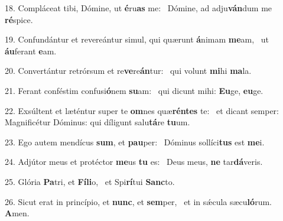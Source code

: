 18. Compláceat tibi, Dómine, ut \textbf{é}ru\textbf{as} me: \ast\  Dómine, ad adju\textbf{ván}dum me \textbf{ré}spice.\

19. Confundántur et revereántur simul, qui quærunt \textbf{á}nimam \textbf{me}am, \ast\  ut \textbf{áu}ferant \textbf{e}am.\

20. Convertántur retrórsum et re\textbf{ve}re\textbf{án}tur: \ast\  qui volunt \textbf{mi}hi \textbf{ma}la.\

21. Ferant conféstim confusi\textbf{ó}nem \textbf{su}am: \ast\  qui dicunt mihi: \textbf{Eu}ge, \textbf{eu}ge.\

22. Exsúltent et læténtur super te \textbf{om}nes quæ\textbf{rén}\textbf{tes} te: \ast\  et dicant semper: Magnificétur Dóminus: qui díligunt salu\textbf{tá}re \textbf{tu}um.\

23. Ego autem mendícus \textbf{sum}, et \textbf{pau}per: \ast\  Dóminus sollíci\textbf{tus} est \textbf{me}i.\

24. Adjútor meus et protéctor \textbf{me}us \textbf{tu} es: \ast\  Deus meus, \textbf{ne} tar\textbf{dá}veris.\

25. Glória \textbf{Pa}tri, et \textbf{Fí}\textbf{li}o, \ast\  et Spi\textbf{rí}tui \textbf{Sanc}to.\

26. Sicut erat in princípio, et \textbf{nunc}, et \textbf{sem}per, \ast\  et in sǽcula sæcu\textbf{ló}rum. \textbf{A}men.\

